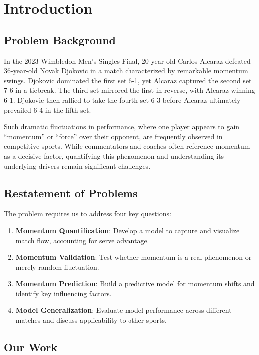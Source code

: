 \documentclass{mcmthesis}
\begin{document}
\section{Introduction}

\subsection{Problem Background}

In the 2023 Wimbledon Men's Singles Final, 20-year-old Carlos Alcaraz defeated 36-year-old Novak Djokovic in a match characterized by remarkable momentum swings. Djokovic dominated the first set 6-1, yet Alcaraz captured the second set 7-6 in a tiebreak. The third set mirrored the first in reverse, with Alcaraz winning 6-1. Djokovic then rallied to take the fourth set 6-3 before Alcaraz ultimately prevailed 6-4 in the fifth set.

Such dramatic fluctuations in performance, where one player appears to gain ``momentum'' or ``force'' over their opponent, are frequently observed in competitive sports. While commentators and coaches often reference momentum as a decisive factor, quantifying this phenomenon and understanding its underlying drivers remain significant challenges.

\subsection{Restatement of Problems}

The problem requires us to address four key questions:
\begin{enumerate}
    \item \textbf{Momentum Quantification}: Develop a model to capture and visualize match flow, accounting for serve advantage.
    \item \textbf{Momentum Validation}: Test whether momentum is a real phenomenon or merely random fluctuation.
    \item \textbf{Momentum Prediction}: Build a predictive model for momentum shifts and identify key influencing factors.
    \item \textbf{Model Generalization}: Evaluate model performance across different matches and discuss applicability to other sports.
\end{enumerate}

\subsection{Our Work}
\end{document}
